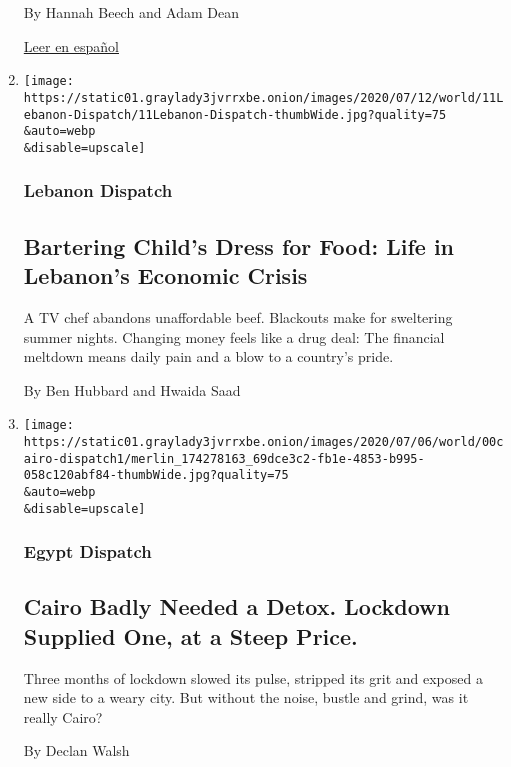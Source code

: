 \begin{enumerate}
  By Hannah Beech and Adam Dean

  \href{https://www.nytimes3xbfgragh.onion/es/2020/07/21/espanol/mundo/coronavirus-tailandia.html}{Leer
  en español}
\item
  \href{/2020/07/12/world/middleeast/beirut-lebanon-economic-crisis.html}{}

  \texttt{[image: https://static01.graylady3jvrrxbe.onion/images/2020/07/12/world/11Lebanon-Dispatch/11Lebanon-Dispatch-thumbWide.jpg?quality=75\\\&auto=webp\\\&disable=upscale]}

  \hypertarget{lebanon-dispatch}{%
  \subsubsection{Lebanon Dispatch}\label{lebanon-dispatch}}

  \hypertarget{bartering-childs-dress-for-food-life-in-lebanons-economic-crisis}{%
  \subsection{Bartering Child's Dress for Food: Life in Lebanon's
  Economic
  Crisis}\label{bartering-childs-dress-for-food-life-in-lebanons-economic-crisis}}

  A TV chef abandons unaffordable beef. Blackouts make for sweltering
  summer nights. Changing money feels like a drug deal: The financial
  meltdown means daily pain and a blow to a country's pride.

  By Ben Hubbard and Hwaida Saad
\item
  \href{/2020/07/09/world/middleeast/cairo-lockdown-detox.html}{}

  \texttt{[image: https://static01.graylady3jvrrxbe.onion/images/2020/07/06/world/00cairo-dispatch1/merlin\_174278163\_69dce3c2-fb1e-4853-b995-058c120abf84-thumbWide.jpg?quality=75\\\&auto=webp\\\&disable=upscale]}

  \hypertarget{egypt-dispatch}{%
  \subsubsection{Egypt Dispatch}\label{egypt-dispatch}}

  \hypertarget{cairo-badly-needed-a-detox-lockdown-supplied-one-at-a-steep-price}{%
  \subsection{Cairo Badly Needed a Detox. Lockdown Supplied One, at a
  Steep
  Price.}\label{cairo-badly-needed-a-detox-lockdown-supplied-one-at-a-steep-price}}

  Three months of lockdown slowed its pulse, stripped its grit and
  exposed a new side to a weary city. But without the noise, bustle and
  grind, was it really Cairo?

  By Declan Walsh
\end{enumerate}

